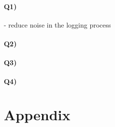 \documentclass[12pt]{report}
\begin{document}
\paragraph{Q1)} 
- reduce noise in the logging process

\paragraph{Q2)} 

\paragraph{Q3)} 

\paragraph{Q4)} 

\newpage
\section{Appendix}
\end{document}
